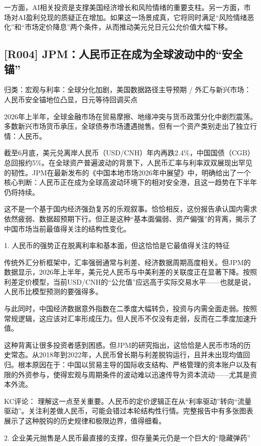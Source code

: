 \documentclass[11pt]{ctexart}
\begin{document}
一方面，AI相关投资是支撑美国经济增长和风险情绪的重要支柱。另一方面，市场对AI盈利兑现的质疑正在增加。如果这一场景成真，它将同时满足“风险情绪恶化”和“市场定价降息”两个条件，从而推动美元兑日元公允价值大幅下移。

\subsection{[R004] JPM：人民币正在成为全球波动中的“安全锚”}
{\small\color{refgray}归类：宏观与利率：全球分化加剧，美国数据路径主导预期 / 外汇与新兴市场：人民币安全锚地位凸显，日元等待回调买点}

2026年上半年，全球金融市场在贸易摩擦、地缘冲突与货币政策分化中剧烈震荡。多数新兴市场货币承压，全球债券市场遭遇抛售。但有一个资产类别走出了独立行情：人民币。

截至6月底，美元兑离岸人民币（USD/CNH）年内再跌2.4\%，中国国债（CGB）总回报约5\%。在全球资产普遍波动的背景下，人民币汇率与利率双双展现出罕见的韧性。JPM在最新发布的《中国本地市场2026年中展望》中，明确给出了一个核心判断：人民币正在成为全球高波动环境下的相对安全港，且这一趋势在下半年仍将持续。

这不是一个基于国内经济强劲复苏的乐观叙事。恰恰相反，这份报告承认国内需求依然疲弱、数据超预期下行。但正是这种“基本面偏弱、资产偏强”的背离，揭示了中国市场当前最值得关注的结构性变化。

1. 人民币的强势正在脱离利率和基本面，但这恰恰是它最值得关注的特征

传统外汇分析框架中，汇率强弱通常与利差、经济数据周期高度相关。但JPM的数据显示，2026年上半年，美元兑人民币与中美利差的关联度正在显著下降。按照利差定价模型，当前USD/CNH的“公允值”应远高于实际交易水平——也就是说，人民币比模型预测的要强得多。

与此同时，中国经济数据意外指数在二季度大幅转负，投资与内需全面走弱。按照常规逻辑，这应该对汇率形成压力。但人民币不仅没有走弱，反而在二季度加速升值。

这种背离让很多投资者感到困惑。但JPM的研究指出，这恰恰是人民币市场的历史常态。从2018年到2022年，人民币曾长期与利差脱钩运行，且并未出现均值回归。根本原因在于：中国以贸易主导的国际收支结构、严格管理的资本账户以及有限的外资参与，使得宏观与周期条件的波动难以迅速传导为资本流动——尤其是资本外流。

KC评论： 理解这一点至关重要。人民币的定价逻辑正在从“利率驱动”转向“流量驱动”。关注利差做人民币，可能会错过本轮结构性行情。完整报告中有多张图表展示了这种脱钩的历史规律和极限边界，值得细看。

2. 企业美元抛售是人民币最直接的支撑，但存量美元仍是一个巨大的“隐藏弹药”
\end{document}
